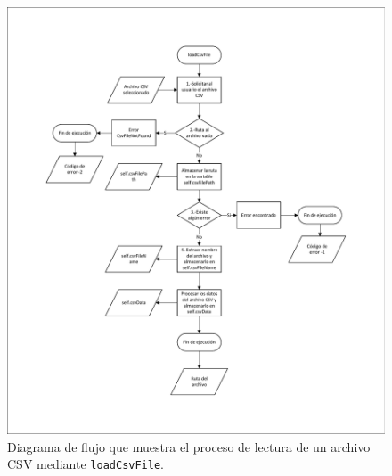 
\begin{figure}[H]
\centering
\includegraphics[width=.92\textwidth]{fig/Diagramas de flujo/loadCsvFile.pdf}
\caption{Diagrama de flujo que muestra el proceso de lectura de un archivo \acrshort{CSV} mediante \texttt{loadCsvFile}.}
\label{fig:DiagramaFlujoLoadCsvFile}
\end{figure}

